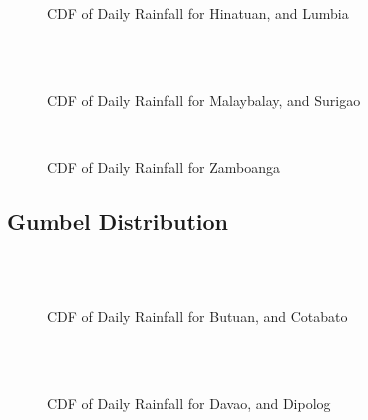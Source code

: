 \begin{figure}[H]
  \centering
  \\
  \\
  \caption{CDF of Daily Rainfall for Hinatuan, and Lumbia}
  \label{fig:weekly_without_threshold_appendix_gev_pt4}
\end{figure}

\begin{figure}[H]
  \centering
  \\
  \\
  \caption{CDF of Daily Rainfall for Malaybalay, and Surigao}
  \label{fig:weekly_without_threshold_appendix_gev_pt5}
\end{figure}

\begin{figure}[H]
  \centering
  \\
  \caption{CDF of Daily Rainfall for Zamboanga}
  \label{fig:weekly_without_threshold_appendix_gev_pt6}
\end{figure}

\subsection{Gumbel Distribution}

\begin{figure}[H]
  \centering
  \\
  \\
  \caption{CDF of Daily Rainfall for Butuan, and Cotabato}
  \label{fig:weekly_without_threshold_appendix_gumbel_pt1}
\end{figure}

\begin{figure}[H]
  \centering
  \\
  \\
  \caption{CDF of Daily Rainfall for Davao, and Dipolog}
  \label{fig:weekly_without_threshold_appendix_gumbel_pt2}
\end{figure}

